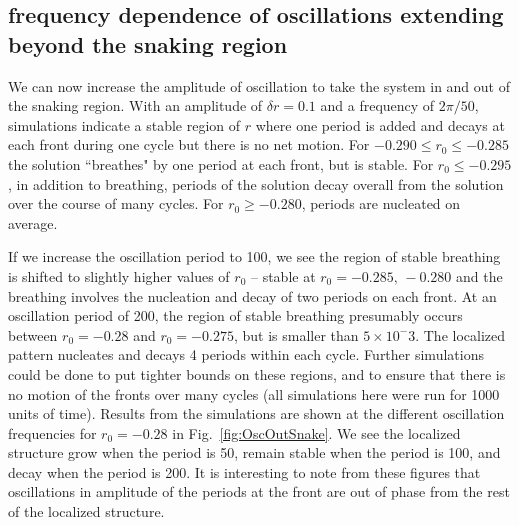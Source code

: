 \documentclass[pre,preprint,superscriptaddress]{revtex4-1}
\begin{document}
\subsection{frequency dependence of oscillations extending beyond the snaking region}
We can now increase the amplitude of oscillation to take the system in and out of the snaking region.  With an amplitude of $\delta r=0.1$ and a frequency of $2\pi/50$, simulations indicate a stable region of $r$ where one period is added and decays at each front during one cycle but there is no net motion. For $ -0.290\le r_0\le-0.285$ the solution ``breathes" by one period at each front, but is stable.  For $r_0 \le -0.295$, in addition to breathing, periods of the solution decay overall from the solution over the course of many cycles. For $r_0 \ge -0.280$,  periods are nucleated on average. 

If we increase the oscillation period to 100, we see the region of stable breathing is shifted to slightly higher values of $r_0$ -- stable at $r_0=-0.285, \, -0.280$ and the breathing involves the nucleation and decay of two periods on each front.  At an oscillation period of 200, the region of stable breathing presumably  occurs between $r_0=-0.28$ and $r_0=-0.275$, but is smaller than $5\times 10^-3$.  The localized pattern nucleates and decays 4 periods within each cycle.  Further simulations could be done to put tighter bounds on these regions, and to ensure that there is no motion of the fronts over many cycles (all simulations here were run for 1000 units of time).   Results from the simulations are shown at the different oscillation frequencies for $r_0=-0.28$ in Fig.~\ref{fig:OscOutSnake}.  We see the localized structure grow when the period is 50, remain stable when the period is 100, and decay when the period is 200.   It is interesting to note from these figures that oscillations in amplitude of the periods at the front are out of phase from the rest of the localized structure.
\end{document}
